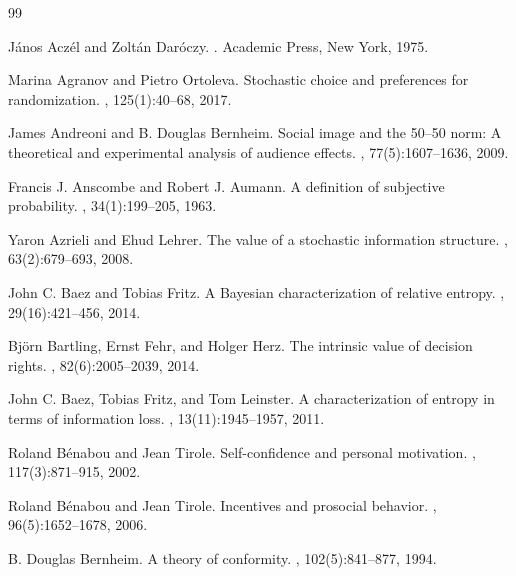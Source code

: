 \documentclass[11pt,a4paper]{article}
\theoremstyle{definition}
\newcommand{\1}{\mathbf 1}
\begin{document}
\begin{thebibliography}{99}
\raggedright

J\'anos Acz\'el and Zolt\'an Dar\'oczy.
.
\newblock Academic Press, New York, 1975.

Marina Agranov and Pietro Ortoleva.
\newblock Stochastic choice and preferences for randomization.
, 125(1):40--68, 2017.

James Andreoni and B. Douglas Bernheim.
\newblock Social image and the 50--50 norm: A theoretical and experimental analysis of audience effects.
, 77(5):1607--1636, 2009.

Francis J. Anscombe and Robert J. Aumann.
\newblock A definition of subjective probability.
, 34(1):199--205, 1963.

Yaron Azrieli and Ehud Lehrer.
\newblock The value of a stochastic information structure.
, 63(2):679--693, 2008.

John C. Baez and Tobias Fritz.
\newblock A {B}ayesian characterization of relative entropy.
, 29(16):421--456, 2014.

Bj\"orn Bartling, Ernst Fehr, and Holger Herz.
\newblock The intrinsic value of decision rights.
, 82(6):2005--2039, 2014.

John C. Baez, Tobias Fritz, and Tom Leinster.
\newblock A characterization of entropy in terms of information loss.
, 13(11):1945--1957, 2011.

Roland B\'enabou and Jean Tirole.
\newblock Self-confidence and personal motivation.
, 117(3):871--915, 2002.

Roland B\'enabou and Jean Tirole.
\newblock Incentives and prosocial behavior.
, 96(5):1652--1678, 2006.

B. Douglas Bernheim.
\newblock A theory of conformity.
, 102(5):841--877, 1994.


\end{thebibliography}
\end{document}
